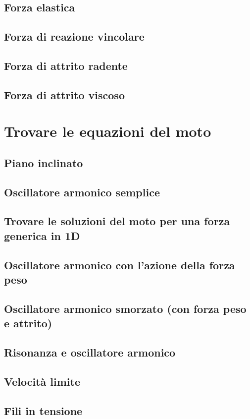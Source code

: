 \documentclass[a4paper]{article}
\begin{document}
\subsection{Forza elastica}
\subsection{Forza di reazione vincolare}
\subsection{Forza di attrito radente}
\subsection{Forza di attrito viscoso}

\section{Trovare le equazioni del moto}
\subsection{Piano inclinato}
\subsection{Oscillatore armonico semplice}
\subsection{Trovare le soluzioni del moto per una forza generica in 1D}
\subsection{Oscillatore armonico con l'azione della forza peso}
\subsection{Oscillatore armonico smorzato (con forza peso e attrito)}
\subsection{Risonanza e oscillatore armonico}
\subsection{Velocità limite}
\subsection{Fili in tensione}
\end{document}
